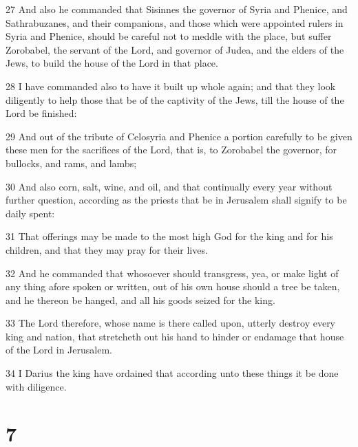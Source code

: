 \par 27 And also he commanded that Sisinnes the governor of Syria and Phenice, and Sathrabuzanes, and their companions, and those which were appointed rulers in Syria and Phenice, should be careful not to meddle with the place, but suffer Zorobabel, the servant of the Lord, and governor of Judea, and the elders of the Jews, to build the house of the Lord in that place.
\par 28 I have commanded also to have it built up whole again; and that they look diligently to help those that be of the captivity of the Jews, till the house of the Lord be finished:
\par 29 And out of the tribute of Celosyria and Phenice a portion carefully to be given these men for the sacrifices of the Lord, that is, to Zorobabel the governor, for bullocks, and rams, and lambs;
\par 30 And also corn, salt, wine, and oil, and that continually every year without further question, according as the priests that be in Jerusalem shall signify to be daily spent:
\par 31 That offerings may be made to the most high God for the king and for his children, and that they may pray for their lives.
\par 32 And he commanded that whosoever should transgress, yea, or make light of any thing afore spoken or written, out of his own house should a tree be taken, and he thereon be hanged, and all his goods seized for the king.
\par 33 The Lord therefore, whose name is there called upon, utterly destroy every king and nation, that stretcheth out his hand to hinder or endamage that house of the Lord in Jerusalem.
\par 34 I Darius the king have ordained that according unto these things it be done with diligence.

\chapter{7}

